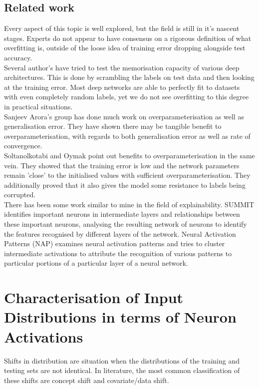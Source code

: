 \documentclass{article}
\begin{document}
        \subsection{Related work}
            Every aspect of this topic is well explored, but the field is still in it's nascent stages. Experts do not appear to have consensus on a rigorous definition of what overfitting is, outside of the loose idea of training error dropping alongside test accuracy. \\
            Several author's have tried to test the memorisation capacity of various deep architectures. This is done by scrambling the labels on test data and then looking at the training error. Most deep networks are able to perfectly fit to datasets with even completely random labels, yet we do not see overfitting to this degree in practical situations. \\
            Sanjeev Arora's group has done much work on overparameterisation as well as generalisation error. They have shown there may be tangible benefit to overparameterisation, with regards to both generalisation error as well as rate of convergence. \\
            Soltanolkotabi and Oymak point out benefits to overparameterisation in the same vein. They showed that the training error is low and the network parameters remain 'close' to the initialised values with sufficient overparameterisation. They additionally proved that it also gives the model some resistance to labels being corrupted. \\
            There has been some work similar to mine in the field of explainability. SUMMIT identifies important neurons in intermediate layers and relationships between these important neurons, analysing the resulting network of neurons to identify the features recognised by different layers of the network. Neural Activation Patterns (NAP) examines neural activation patterns and tries to cluster intermediate activations to attribute the recognition of various patterns to particular portions of a particular layer of a neural network. \\

    \section{Characterisation of Input Distributions in terms of Neuron Activations}
        Shifts in distribution are situation when the distributions of the training and testing sets are not identical. In literature, the most common classification of these shifts are concept shift and covariate/data shift. \\
\end{document}
